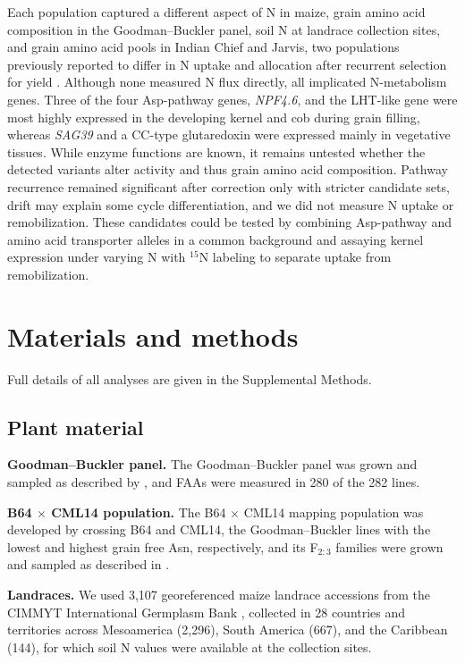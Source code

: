 \documentclass[namedate,unnumsec,webpdf,contemporary,large]{oup-authoring-template}
\begin{document}
Each population captured a different aspect of N in maize, grain amino acid composition in the Goodman--Buckler panel, soil N at landrace collection sites, and grain amino acid pools in Indian Chief and Jarvis, two populations previously reported to differ in N uptake and allocation after recurrent selection for yield \citep{Moll1994}. Although none measured N flux directly, all implicated N-metabolism genes. Three of the four Asp-pathway genes, \textit{NPF4.6}, and the LHT-like gene were most highly expressed in the developing kernel and cob during grain filling, whereas \textit{SAG39} and a CC-type glutaredoxin were expressed mainly in vegetative tissues. While enzyme functions are known, it remains untested whether the detected variants alter activity and thus grain amino acid composition. Pathway recurrence remained significant after correction only with stricter candidate sets, drift may explain some cycle differentiation, and we did not measure N uptake or remobilization. These candidates could be tested by combining Asp-pathway and amino acid transporter alleles in a common background and assaying kernel expression under varying N with $^{15}$N labeling to separate uptake from remobilization.


\section{Materials and methods}
Full details of all analyses are given in the Supplemental Methods.

\subsection{Plant material}

\noindent\textbf{Goodman--Buckler panel.} The Goodman--Buckler panel \citep{FlintGarcia2005Goodman} was grown and sampled as described by \citet{Shrestha2022}, and FAAs were measured in 280 of the 282 lines.

\noindent\textbf{B64 $\times$ CML14 population.} The B64 $\times$ CML14 mapping population was developed by crossing B64 and CML14, the Goodman--Buckler lines with the lowest and highest grain free Asn, respectively, and its F$_{2:3}$ families were grown and sampled as described in \citet{Fitzsimmons2026KernelKitchen}.

\noindent\textbf{Landraces.} We used 3,107 georeferenced maize landrace accessions from the CIMMYT International Germplasm Bank \citep{RomeroNavarro2017Landraces}, collected in 28 countries and territories across Mesoamerica (2,296), South America (667), and the Caribbean (144), for which soil N values were available at the collection sites.
\end{document}
